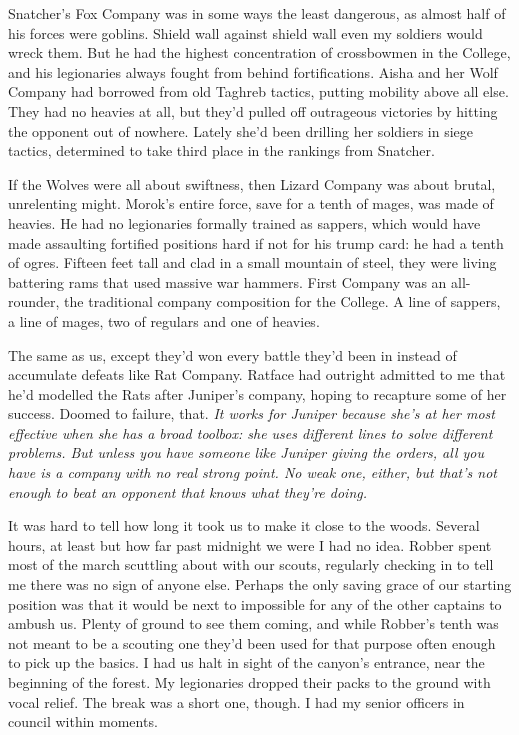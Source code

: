 \documentclass[12pt, openany]{book}
\begin{document}
Snatcher’s Fox Company was in some ways the least dangerous, as almost half of his forces were goblins. Shield wall against shield wall even my soldiers would wreck them. But he had the highest concentration of crossbowmen in the College, and his legionaries always fought from behind fortifications. Aisha and her Wolf Company had borrowed from old Taghreb tactics, putting mobility above all else. They had no heavies at all, but they’d pulled off outrageous victories by hitting the opponent out of nowhere. Lately she’d been drilling her soldiers in siege tactics, determined to take third place in the rankings from Snatcher. 

If the Wolves were all about swiftness, then Lizard Company was about brutal, unrelenting might. Morok’s entire force, save for a tenth of mages, was made of heavies. He had no legionaries formally trained as sappers, which would have made assaulting fortified positions hard if not for his trump card: he had a tenth of ogres. Fifteen feet tall and clad in a small mountain of steel, they were living battering rams that used massive war hammers. First Company was an all-rounder, the traditional company composition for the College. A line of sappers, a line of mages, two of regulars and one of heavies. 

The same as us, except they’d won every battle they’d been in instead of accumulate defeats like Rat Company. Ratface had outright admitted to me that he’d modelled the Rats after Juniper’s company, hoping to recapture some of her success. Doomed to failure, that.\textit{ It works for Juniper because she’s at her most effective when she has a broad toolbox: she uses different lines to solve different problems. But unless you have someone like Juniper giving the orders, all you have is a company with no real strong point. No weak one, either, but that’s not enough to beat an opponent that knows what they’re doing.}

It was hard to tell how long it took us to make it close to the woods. Several hours, at least but how far past midnight we were I had no idea. Robber spent most of the march scuttling about with our scouts, regularly checking in to tell me there was no sign of anyone else. Perhaps the only saving grace of our starting position was that it would be next to impossible for any of the other captains to ambush us. Plenty of ground to see them coming, and while Robber’s tenth was not meant to be a scouting one they’d been used for that purpose often enough to pick up the basics. I had us halt in sight of the canyon’s entrance, near the beginning of the forest. My legionaries dropped their packs to the ground with vocal relief. The break was a short one, though. I had my senior officers in council within moments.
\end{document}
